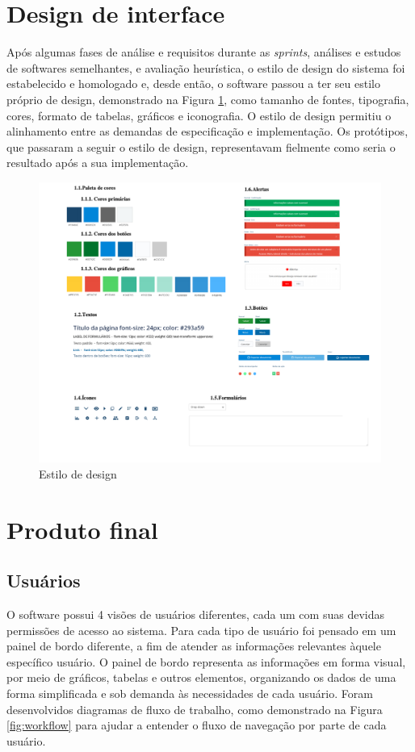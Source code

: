 \section{Design de interface}
Após algumas fases de análise e requisitos durante as \textit{sprints}, análises e estudos de softwares semelhantes, e avaliação heurística, o estilo de design do sistema foi estabelecido e homologado e, desde então, o software passou a ter seu estilo próprio de design, demonstrado na Figura \ref{fig:estilo}, como tamanho de fontes, tipografia, cores, formato de tabelas, gráficos e iconografia. O estilo de design permitiu o alinhamento entre as demandas de especificação e implementação. Os protótipos, que passaram a seguir o estilo de design, representavam fielmente como seria o resultado após a sua implementação. 

\begin{figure}[H]
\centering
\includegraphics[width=1.1\textwidth]{images/estilo.png}
\caption{Estilo de design}
\label{fig:estilo}
\end{figure}


\section{Produto final}
\subsection{Usuários}
O software possui 4 visões de usuários diferentes, cada um com suas devidas permissões de acesso ao sistema. Para cada tipo de usuário foi pensado em um painel de bordo diferente, a fim de atender as informações relevantes àquele específico usuário. O painel de bordo representa as informações em forma visual, por meio de gráficos, tabelas e outros elementos, organizando os dados de uma forma simplificada e sob demanda às necessidades de cada usuário. Foram desenvolvidos diagramas de fluxo de trabalho, como demonstrado na Figura \ref{fig:workflow} para ajudar a entender o fluxo de navegação por parte de cada usuário.

